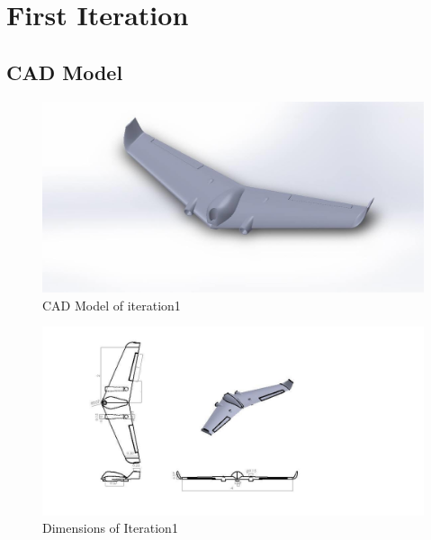 \chapter{First Iteration}
\section{CAD Model}
\begin{figure}[H]
\centering
\includegraphics[width = \textwidth]{iter1.png}
\caption{CAD Model of iteration1}
\end{figure}
\begin{figure}[H]
 \centering
 \includegraphics[width = 1.5\textwidth]{iter1-2.png}
 \caption{Dimensions of Iteration1}
\end{figure}

